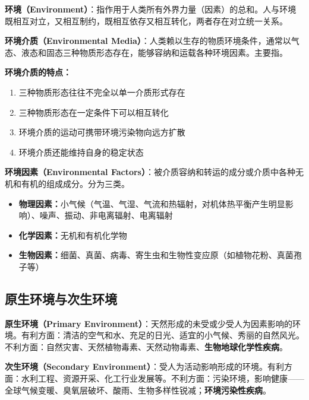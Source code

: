 \documentclass[10pt,a4paper,oneside]{ctexbook}
\begin{document}
\begin{defbox}
\textbf{环境（Environment）}：指作用于人类所有外界力量（因素）的总和。人与环境既相互对立，又相互制约，既相互依存又相互转化，两者存在对立统一关系。
\end{defbox}

\begin{defbox}
\textbf{环境介质（Environmental Media）}：人类赖以生存的物质环境条件，通常以气态、液态和固态三种物质形态存在，能够容纳和运载各种环境因素。主要指。
\end{defbox}

\textbf{环境介质的特点：}
\begin{enumerate}[leftmargin=*]
    \item 三种物质形态往往不完全以单一介质形式存在
    \item 三种物质形态在一定条件下可以相互转化
    \item 环境介质的运动可携带环境污染物向远方扩散
    \item 环境介质还能维持自身的稳定状态
\end{enumerate}

\begin{defbox}
\textbf{环境因素（Environmental Factors）}：被介质容纳和转运的成分或介质中各种无机和有机的组成成分。分为三类。

\begin{itemize}[leftmargin=*]
    \item \textbf{物理因素：}小气候（气温、气湿、气流和热辐射，对机体热平衡产生明显影响）、噪声、振动、非电离辐射、电离辐射
    \item \textbf{化学因素：}无机和有机化学物
    \item \textbf{生物因素：}细菌、真菌、病毒、寄生虫和生物性变应原（如植物花粉、真菌孢子等）
\end{itemize}
\end{defbox}

\subsection{原生环境与次生环境}

\begin{defbox}
\textbf{原生环境（Primary Environment）}：天然形成的未受或少受人为因素影响的环境。有利方面：清洁的空气和水、充足的日光、适宜的小气候、秀丽的自然风光。不利方面：自然灾害、天然植物毒素、天然动物毒素、\textbf{生物地球化学性疾病}。

\textbf{次生环境（Secondary Environment）}：受人为活动影响形成的环境。有利方面：水利工程、资源开采、化工行业发展等。不利方面：污染环境，影响健康——全球气候变暖、臭氧层破坏、酸雨、生物多样性锐减；\textbf{环境污染性疾病}。
\end{defbox}
\end{document}
